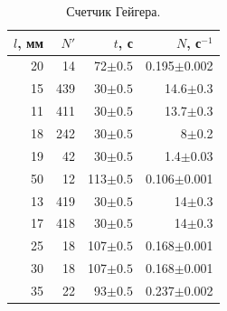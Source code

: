 \documentclass[a4paper,12pt]{article} %
\begin{document}
	
		\begin{table}[H]
			\caption{Счетчик Гейгера.}
			\label{table:exp1}
			\begin{tabular}{|r|r|r|r|}
				\hline
				$l$, мм &    $N'$ &    $t$, с & $N$, с$^{-1}$ \\
				\hline
				20 &   14 &   72$\pm0.5$ &   0.195$\pm$0.002 \\ \hline
				 15 &  439 &   30$\pm0.5$ &  14.6$\pm$0.3 \\ \hline
				 11 &  411 &   30$\pm0.5$ &  13.7$\pm$0.3 \\ \hline
				 18 &  242 &   30$\pm0.5$ &   8$\pm$0.2 \\ \hline
				 19 &   42 &   30$\pm0.5$ &   1.4$\pm$0.03\\ \hline
				50 &   12 &  113$\pm0.5$ &   0.106$\pm$0.001 \\ \hline
				 13 &  419 &   30$\pm0.5$ &  14$\pm$0.3 \\ \hline
				 17 &  418 &   30$\pm0.5$ &  14$\pm$0.3 \\ \hline
				25 &   18 &  107$\pm0.5$ &   0.168$\pm$0.001 \\ \hline
				30 &   18 &  107$\pm0.5$ &   0.168$\pm$0.001 \\ \hline
				35 &   22 &   93$\pm0.5$ &   0.237$\pm$0.002 \\ \hline

				\end{tabular}
		\end{table}
	
\end{document}
